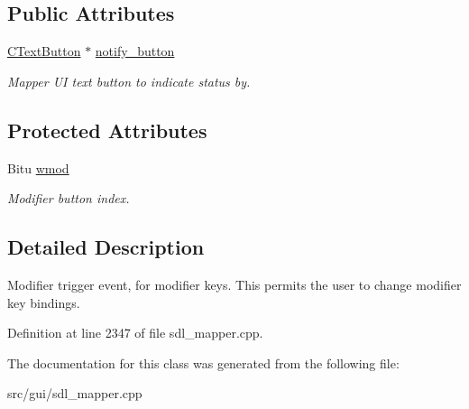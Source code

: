 \subsection*{Public Attributes}
\begin{DoxyCompactItemize}
\item 
\hypertarget{classCModEvent_aa5dc746da9ec638e1959bfd1dddafc75}{\hyperlink{classCTextButton}{C\-Text\-Button} $\ast$ \hyperlink{classCModEvent_aa5dc746da9ec638e1959bfd1dddafc75}{notify\-\_\-button}}\label{classCModEvent_aa5dc746da9ec638e1959bfd1dddafc75}

\begin{DoxyCompactList}\small\item\em Mapper U\-I text button to indicate status by. \end{DoxyCompactList}\end{DoxyCompactItemize}
\subsection*{Protected Attributes}
\begin{DoxyCompactItemize}
\item 
\hypertarget{classCModEvent_a54a25228b8da694c33c44e4b161defd9}{Bitu \hyperlink{classCModEvent_a54a25228b8da694c33c44e4b161defd9}{wmod}}\label{classCModEvent_a54a25228b8da694c33c44e4b161defd9}

\begin{DoxyCompactList}\small\item\em Modifier button index. \end{DoxyCompactList}\end{DoxyCompactItemize}


\subsection{Detailed Description}
Modifier trigger event, for modifier keys. This permits the user to change modifier key bindings. 

Definition at line 2347 of file sdl\-\_\-mapper.\-cpp.



The documentation for this class was generated from the following file\-:\begin{DoxyCompactItemize}
\item 
src/gui/sdl\-\_\-mapper.\-cpp\end{DoxyCompactItemize}
